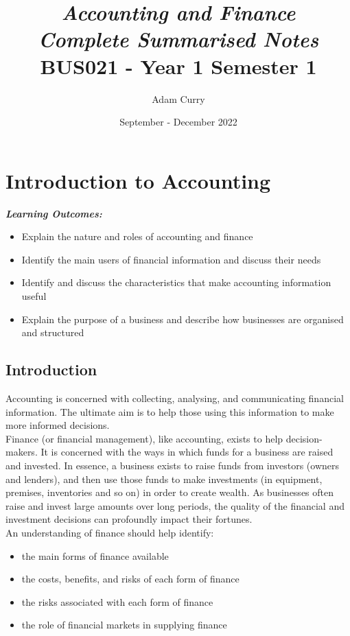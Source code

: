 \documentclass{report}
\title{\huge{\textit{\textbf{Accounting and Finance}}}\\
\Large\textbf{\textit{Complete Summarised Notes}}\\
BUS021 - Year 1 Semester 1}
\author{Adam Curry}
\date{September - December 2022}
\newenvironment{blackbox}[1][Black]
  {\begin{tcolorbox}[colframe=#1,colback=white]}
  {\end{tcolorbox}}
\begin{document}
\maketitle
\tableofcontents

\chapter{Introduction to Accounting}
\begin{blackbox}
    \textbf{\textit{Learning Outcomes:}}\\
    \begin{itemize}
        \item Explain the nature and roles of accounting and finance
        \item Identify the main users of financial information and discuss their needs
        \item Identify and discuss the characteristics that make accounting information useful
        \item Explain the purpose of a business and describe how businesses are organised and structured
    \end{itemize}
\end{blackbox}

\section{Introduction}

Accounting is concerned with collecting, analysing, and communicating financial information. The ultimate aim is to help those using this information to make more informed decisions.\\

Finance (or financial management), like accounting, exists to help decision-makers. It is concerned with the ways in which funds for a business are raised and invested. In essence, a business exists to raise funds from investors (owners and lenders), and then use those funds to make investments (in equipment, premises, inventories and so on) in order to create wealth. As businesses often raise and invest large amounts over long periods, the quality of the financial and investment decisions can profoundly impact their fortunes.\\
An understanding of finance should help identify:
\begin{itemize}
    \item the main forms of finance available
    \item the costs, benefits, and risks of each form of finance
    \item the risks associated with each form of finance
    \item the role of financial markets in supplying finance
\end{itemize}
\end{document}
